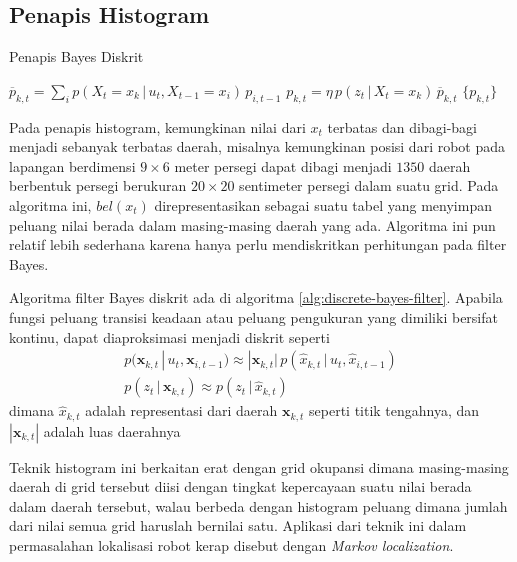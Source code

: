 \subsection{Penapis Histogram}

\begin{algorithm}
    \caption{Penapis Bayes Diskrit}
    \label{alg:discrete-bayes-filter}
    \begin{algorithmic}[1]
        \State $\overline{p}_{k, t} = \sum_i p(X_t = x_k \,|\, u_t, X_{t-1} = x_i)\, p_{i, t-1}$
        \State $p_{k, t} = \eta\, p(z_t \,|\, X_t = x_k)\, \overline{p}_{k, t}$ 
        \EndFor
        \State \Return $\{p_{k, t}\}$
        \EndFunction
    \end{algorithmic}
\end{algorithm}

Pada penapis histogram, kemungkinan nilai dari $x_t$ terbatas dan dibagi-bagi menjadi sebanyak terbatas daerah, misalnya kemungkinan posisi dari robot pada lapangan berdimensi $9 \times 6$ meter persegi dapat dibagi menjadi $1350$ daerah berbentuk persegi berukuran $20 \times 20$ sentimeter persegi dalam suatu grid. Pada algoritma ini, $bel(x_t)$ direpresentasikan sebagai suatu tabel yang menyimpan peluang nilai berada dalam masing-masing daerah yang ada. Algoritma ini pun relatif lebih sederhana karena hanya perlu mendiskritkan perhitungan pada filter Bayes.

Algoritma filter Bayes diskrit ada di algoritma \ref{alg:discrete-bayes-filter}. Apabila fungsi peluang transisi keadaan atau peluang pengukuran yang dimiliki bersifat kontinu, dapat diaproksimasi menjadi diskrit seperti
\begin{align}
    p(\mathbf{x}_{k, t} \,|\, u_t, \mathbf{x}_{i, t-1}) \approx |\mathbf{x}_{k, t}|\, p(\hat{x}_{k, t} \,|\, u_t, \hat{x}_{i, t-1}) \\
    p(z_t \,|\, \mathbf{x}_{k, t}) \approx p(z_t \,|\, \hat{x}_{k, t})
\end{align}
dimana $\hat{x}_{k, t}$ adalah representasi dari daerah $\mathbf{x}_{k, t}$ seperti titik tengahnya, dan $|\mathbf{x}_{k, t}|$ adalah luas daerahnya

Teknik histogram ini berkaitan erat dengan grid okupansi dimana masing-masing daerah di grid tersebut diisi dengan tingkat kepercayaan suatu nilai berada dalam daerah tersebut, walau berbeda dengan histogram peluang dimana jumlah dari nilai semua grid haruslah bernilai satu. Aplikasi dari teknik ini dalam permasalahan lokalisasi robot kerap disebut dengan \textit{Markov localization}.

